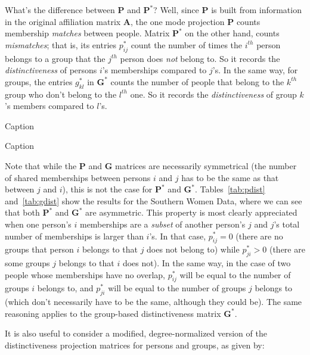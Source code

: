 \documentclass[a4paper,fleqn]{cas-sc}
\begin{document}
What's the difference between $\mathbf{P}$ and $\mathbf{P^*}$? Well, since $\mathbf{P}$ is built from information in the original affiliation matrix $\mathbf{A}$, the one mode projection $\mathbf{P}$ counts membership \textit{matches} between people. Matrix $\mathbf{P^*}$ on the other hand, counts \textit{mismatches}; that is, its entries $p^*_{ij}$ count the number of times the $i^{th}$ person belongs to a group that the $j^{th}$ person does \textit{not} belong to. So it records the \textit{distinctiveness} of persons $i$'s memberships compared to $j$'s. In the same way, for groups, the entries $g^*_{kl}$ in $\mathbf{G^*}$ counts the number of people that belong to the $k^{th}$ group who don't belong to the $l^{th}$ one. So it records the \textit{distinctiveness} of group $k$'s members compared to $l$'s. 

\begin{table}[]
    \centering
    \tiny
    
    \caption{Caption}
    \label{tab:pdist}
\end{table}

\begin{table}[]
    \centering
    
    \caption{Caption}
    \label{tab:gdist}
\end{table}

Note that while the $\mathbf{P}$ and $\mathbf{G}$ matrices are necessarily symmetrical (the number of shared memberships between persons $i$ and $j$ has to be the same as that between $j$ and $i$), this is not the case for $\mathbf{P^*}$ and $\mathbf{G^*}$. Tables~\ref{tab:pdist} and~\ref{tab:gdist} show the results for the Southern Women Data, where we can see that both $\mathbf{P^*}$ and $\mathbf{G^*}$ are asymmetric. This property is most clearly appreciated when one person's $i$ memberships are a \textit{subset} of another person's $j$ and $j$'s total number of memberships is larger than $i$'s. In that case, $p^*_{ij} = 0$ (there are no groups that person $i$ belongs to that $j$ does not belong to) while $p^*_{ji} > 0$ (there are some groups $j$ belongs to that $i$ does not). In the same way, in the case of two people whose memberships have no overlap, $p^*_{ij}$ will be equal to the number of groups $i$ belongs to, and $p^*_{ji}$ will be equal to the number of groups $j$ belongs to (which don't necessarily have to be the same, although they could be).  The same reasoning applies to the group-based distinctiveness matrix $\mathbf{G^*}$.

It is also useful to consider a modified, degree-normalized version of the distinctiveness projection matrices for persons and groups, as given by: 
\end{document}
